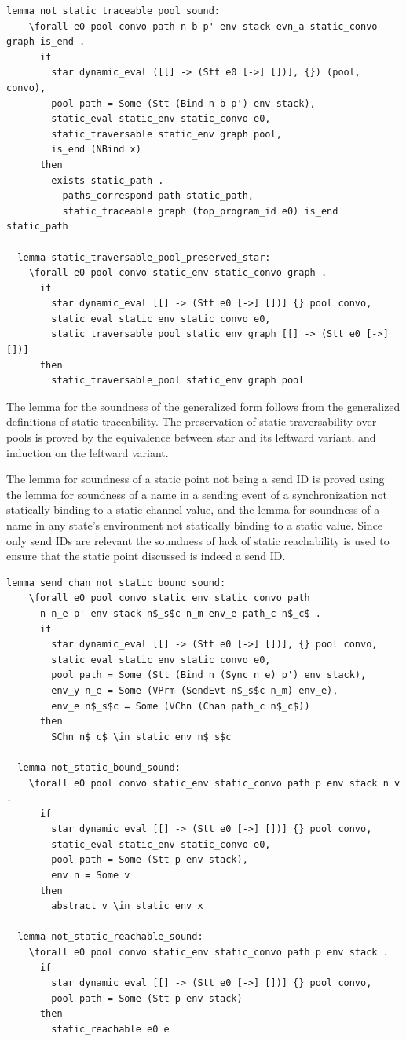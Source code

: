 \documentclass[10pt]{article}
\begin{document}
\begin{lstlisting}[language=logic, mathescape]
  lemma not_static_traceable_pool_sound:
    \forall e0 pool convo path n b p' env stack evn_a static_convo graph is_end .
      if
        star dynamic_eval ([[] -> (Stt e0 [->] [])], {}) (pool, convo), 
        pool path = Some (Stt (Bind n b p') env stack), 
        static_eval static_env static_convo e0, 
        static_traversable static_env graph pool, 
        is_end (NBind x)
      then
        exists static_path . 
          paths_correspond path static_path, 
          static_traceable graph (top_program_id e0) is_end static_path

  lemma static_traversable_pool_preserved_star:
    \forall e0 pool convo static_env static_convo graph .
      if
        star dynamic_eval [[] -> (Stt e0 [->] [])] {} pool convo, 
        static_eval static_env static_convo e0,
        static_traversable_pool static_env graph [[] -> (Stt e0 [->] [])]
      then
        static_traversable_pool static_env graph pool 
\end{lstlisting}


The lemma for the soundness of the generalized form follows from the generalized definitions
of static traceability. The preservation of static traversability over pools is proved by the
equivalence between star and its leftward variant, and induction on the leftward variant.

The lemma for soundness of a static point not being a send ID is proved using the lemma for
soundness of a name in a sending event of a synchronization not statically binding to a static
channel value, and the lemma for soundness of a name in any state's environment
not statically binding to a static value.  Since only send IDs are relevant
the soundness of lack of static reachability is
used to ensure that the static point discussed is indeed a send ID. 

\begin{lstlisting}[language=logic, mathescape]
  lemma send_chan_not_static_bound_sound:
    \forall e0 pool convo static_env static_convo path
      n n_e p' env stack n$_s$c n_m env_e path_c n$_c$ .
      if
        star dynamic_eval [[] -> (Stt e0 [->] [])], {} pool convo,
        static_eval static_env static_convo e0,
        pool path = Some (Stt (Bind n (Sync n_e) p') env stack),
        env_y n_e = Some (VPrm (SendEvt n$_s$c n_m) env_e),
        env_e n$_s$c = Some (VChn (Chan path_c n$_c$))
      then
        SChn n$_c$ \in static_env n$_s$c

  lemma not_static_bound_sound:
    \forall e0 pool convo static_env static_convo path p env stack n v .
      if
        star dynamic_eval [[] -> (Stt e0 [->] [])] {} pool convo,
        static_eval static_env static_convo e0, 
        pool path = Some (Stt p env stack), 
        env n = Some v
      then
        abstract v \in static_env x

  lemma not_static_reachable_sound:
    \forall e0 pool convo static_env static_convo path p env stack .
      if
        star dynamic_eval [[] -> (Stt e0 [->] [])] {} pool convo,
        pool path = Some (Stt p env stack)
      then
        static_reachable e0 e
\end{lstlisting}
\end{document}

